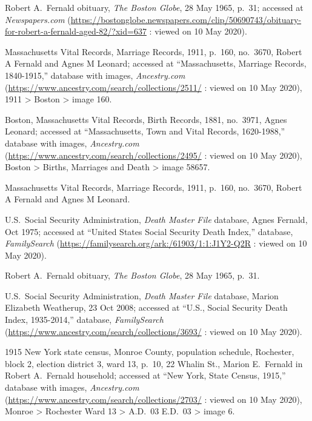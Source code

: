 \begin{thebibliography}{999}
Robert A.\ Fernald obituary, \textit{The Boston Globe}, 28 May 1965, p.\ 31; accessed at \textit{Newspapers.com} (\url{https://bostonglobe.newspapers.com/clip/50690743/obituary-for-robert-a-fernald-aged-82/?xid=637} : viewed on 10 May 2020).

Massachusetts Vital Records, Marriage Records, 1911, p.\ 160, no.\ 3670, Robert A Fernald and Agnes M Leonard; accessed at ``Massachusetts, Marriage Records, 1840-1915,'' database with images, \textit{Ancestry.com} (\url{https://www.ancestry.com/search/collections/2511/} : viewed on 10 May 2020), 1911 > Boston > image 160.

Boston, Massachusetts Vital Records, Birth Records, 1881, no.\ 3971, Agnes Leonard; accessed at ``Massachusetts, Town and Vital Records, 1620-1988,'' database with images, \textit{Ancestry.com} (\url{https://www.ancestry.com/search/collections/2495/} : viewed on 10 May 2020), Boston > Births, Marriages and Death > image 58657.

Massachusetts Vital Records, Marriage Records, 1911, p.\ 160, no.\ 3670, Robert A Fernald and Agnes M Leonard.

U.S.\ Social Security Administration, \textit{Death Master File} database, Agnes Fernald, Oct 1975; accessed at ``United States Social Security Death Index,'' database, \textit{FamilySearch} (\url{https://familysearch.org/ark:/61903/1:1:J1Y2-Q2R} : viewed on 10 May 2020).

Robert A.\ Fernald obituary, \textit{The Boston Globe}, 28 May 1965, p.\ 31.

U.S.\ Social Security Administration, \textit{Death Master File} database, Marion Elizabeth Weatherup, 23 Oct 2008; accessed at ``U.S., Social Security Death Index, 1935-2014,'' database, \textit{FamilySearch} (\url{https://www.ancestry.com/search/collections/3693/} : viewed on 10 May 2020).

1915 New York state census, Monroe County, population schedule, Rochester, block 2, election district 3, ward 13, p.\ 10, 22 Whalin St., Marion E.\ Fernald in Robert A.\ Fernald household; accessed at ``New York, State Census, 1915,'' database with images, \textit{Ancestry.com} (\url{https://www.ancestry.com/search/collections/2703/} : viewed on 10 May 2020), Monroe > Rochester Ward 13 > A.D.\ 03 E.D.\ 03 > image 6.


\end{thebibliography}

